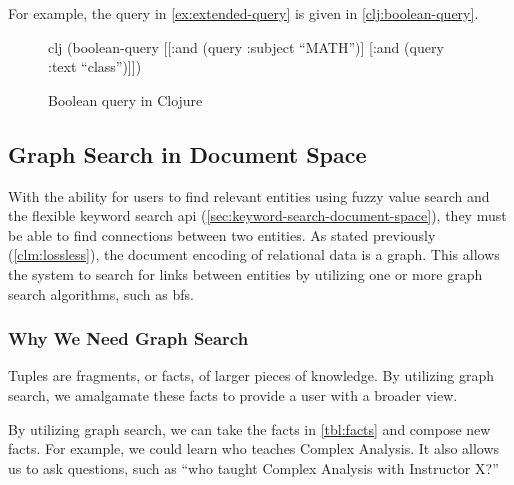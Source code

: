 			\begin{ex}
				For example, the query in \cref{ex:extended-query} is given in \vref{clj:boolean-query}.
				
				\begin{figure}[H]
					\begin{singlespaced}
						\begin{pygments}{clj}
(boolean-query
 [[:and (query :subject ``MATH'')]
  [:and (query :text ``class'')]])
						\end{pygments}
					\end{singlespaced}
					
					\caption{Boolean query in Clojure}
					\label{clj:boolean-query}
				\end{figure}
			\end{ex}

	\subsection{Graph Search in Document Space}
		With the ability for users to find relevant entities using fuzzy value search and the flexible keyword search \gls{api} (\cref{sec:keyword-search-document-space}), they must be able to find connections between two entities.  As stated previously (\cref{clm:lossless}), the document encoding of relational data is a graph.  This allows the system to search for links between entities by utilizing one or more graph search algorithms, such as \gls{bfs}.
		
		\subsubsection{Why We Need Graph Search}
			Tuples are fragments, or facts, of larger pieces of knowledge.  By utilizing graph search, we amalgamate these facts to provide a user with a broader view.
			
				By utilizing graph search, we can take the facts in \cref{tbl:facts} and compose new facts.  For example, we could learn who teaches Complex Analysis.  It also allows us to ask questions, such as ``who taught Complex Analysis with Instructor X?''
			

